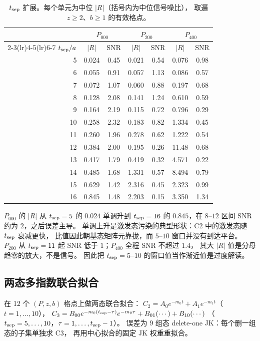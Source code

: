 \documentclass[UTF8,a4paper,11pt]{ctexart}
\begin{document}
\begin{table}[htbp]
\centering
\caption{$t_{\rm sep}$ 扩展。每个单元为中位 $|R|$（括号内为中位信号噪比），
取遍 $z\ge2$、$b\ge1$ 的有效格点。}
\label{tab:tsep}
\footnotesize
\begin{tabular}{@{}rcccccc@{}}
\toprule
 & \multicolumn{2}{c}{$P_{000}$} & \multicolumn{2}{c}{$P_{200}$}
 & \multicolumn{2}{c}{$P_{400}$} \\
\cmidrule(lr){2-3}\cmidrule(lr){4-5}\cmidrule(lr){6-7}
$t_{\rm sep}/a$ & $|R|$ & SNR & $|R|$ & SNR & $|R|$ & SNR \\
\midrule
 5 & 0.024 & 0.45 & 0.021 & 0.54 & 0.076 & 0.98 \\
 6 & 0.055 & 0.91 & 0.057 & 1.13 & 0.086 & 0.57 \\
 7 & 0.072 & 1.07 & 0.060 & 0.88 & 0.197 & 0.68 \\
 8 & 0.128 & 2.08 & 0.141 & 1.24 & 0.610 & 0.59 \\
 9 & 0.164 & 2.19 & 0.115 & 0.72 & 0.796 & 0.29 \\
10 & 0.258 & 2.32 & 0.183 & 0.82 & 1.334 & 0.45 \\
11 & 0.260 & 1.96 & 0.278 & 0.62 & 1.222 & 0.54 \\
12 & 0.384 & 2.00 & 0.195 & 0.26 & 11.48 & 0.68 \\
13 & 0.417 & 1.79 & 0.419 & 0.32 & 4.571 & 0.22 \\
14 & 0.485 & 1.68 & 1.331 & 0.57 & 8.494 & 0.79 \\
15 & 0.629 & 1.42 & 2.316 & 0.45 & 2.323 & 0.99 \\
16 & 0.845 & 1.48 & 2.203 & 0.15 & 3.350 & 1.34 \\
\bottomrule
\end{tabular}
\end{table}

$P_{000}$ 的 $|R|$ 从 $t_{\rm sep}=5$ 的 $0.024$ 单调升到 $t_{\rm sep}=16$
的 $0.845$，在 $8$--$12$ 区间 SNR 约为 $2$，之后误差主导。
单调上升是激发态污染的典型形状：C2 中的激发态随 $t_{\rm sep}$ 衰减更快，
比值因此朝基态矩阵元靠拢，而 $5$--$10$ 窗口并没有到达平台。
$P_{200}$ 从 $t_{\rm sep}=11$ 起 SNR 低于 $1$；$P_{400}$ 全程 SNR 不超过 $1.4$，
其大 $|R|$ 值是分母趋零的放大，不是信号。
因此把 $t_{\rm sep}=5$--$10$ 的窗口值当作渐近值是过度解读。

\subsection{两态多指数联合拟合}

在 12 个 $(P,z,b)$ 格点上做两态联合拟合：
$C_2 = A_0 e^{-m_0 t} + A_1 e^{-m_1 t}$（$t=1,\dots,10$），
$C_3 = B_{00}e^{-m_0(t_{\rm sep}-\tau)}e^{-m_0\tau} + B_{01}(\cdots) + B_{10}(\cdots)$
（$t_{\rm sep}=5,\dots,10$，$\tau=1,\dots,t_{\rm sep}-1$）。
误差为 9 组态 delete-one JK：每个删一组态的子集单独求 C3，
再用中心拟合的固定 JK 权重重拟合。
\end{document}
